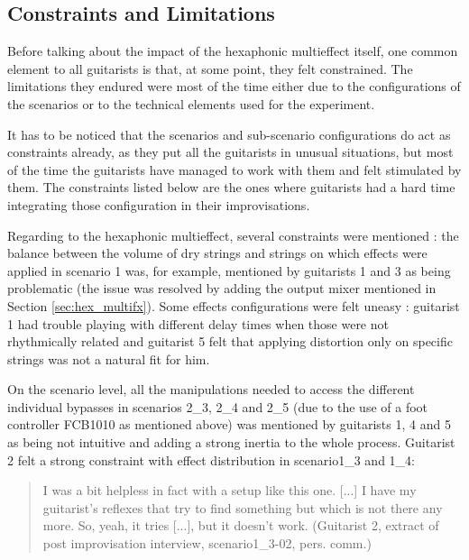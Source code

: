 \documentclass{article}
\begin{document}

\subsection{Constraints and Limitations}
Before talking about the impact of the hexaphonic multieffect itself, one common element to all guitarists is that, at some point, they felt constrained. The limitations they endured were most of the time either due to the configurations of the scenarios or to the technical elements used for the experiment.

It has to be noticed that the scenarios and sub-scenario configurations do act as constraints already, as they put all the guitarists in unusual situations, but most of the time the guitarists have managed to work with them and felt stimulated by them. The constraints listed below are the ones where guitarists had a hard time integrating those configuration in their improvisations.

Regarding to the hexaphonic multieffect, several cons\-traints were mentioned : the balance between the volume of dry strings and strings on which effects were applied in scenario 1 was, for example, mentioned by guitarists 1 and 3 as being problematic (the issue was resolved by adding the output mixer mentioned in Section \ref{sec:hex_multifx}). Some effects configurations were felt uneasy : guitarist 1 had trouble playing with different delay times when those were not rhythmically related and guitarist 5 felt that applying distortion only on specific strings was not a natural fit for him. 

On the scenario level, all the manipulations needed to access the different individual bypasses in scenarios 2\_3, 2\_4 and 2\_5 (due to the use of a foot controller FCB1010 as mentioned above) was mentioned by guitarists 1, 4 and 5 as being not intuitive and adding a strong inertia to the whole process.
Guitarist 2 felt a strong constraint with effect distribution in scenario1\_3 and 1\_4:
    \begin{quote}
        I was a bit helpless in fact with a setup like this one. [...] I have my guitarist's reflexes that try to find something but which is not there any more. So, yeah, it tries [...], but it doesn't work. (Guitarist 2, extract of post improvisation interview, scenario1\_3-02, pers. comm.)
    \end{quote}
\end{document}
